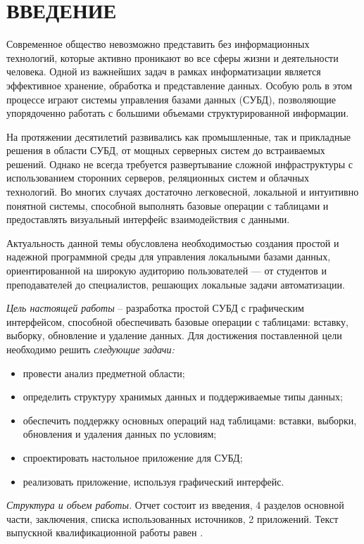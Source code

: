 \section*{ВВЕДЕНИЕ}

Современное общество невозможно представить без информационных технологий, которые активно проникают во все сферы жизни и деятельности человека. Одной из важнейших задач в рамках информатизации является эффективное хранение, обработка и представление данных. Особую роль в этом процессе играют системы управления базами данных (СУБД), позволяющие упорядоченно работать с большими объемами структурированной информации.

На протяжении десятилетий развивались как промышленные, так и прикладные решения в области СУБД, от мощных серверных систем до встраиваемых решений. Однако не всегда требуется развертывание сложной инфраструктуры с использованием сторонних серверов, реляционных систем и облачных технологий. Во многих случаях достаточно легковесной, локальной и интуитивно понятной системы, способной выполнять базовые операции с таблицами и предоставлять визуальный интерфейс взаимодействия с данными.

Актуальность данной темы обусловлена необходимостью создания простой и надежной программной среды для управления локальными базами данных, ориентированной на широкую аудиторию пользователей — от студентов и преподавателей до специалистов, решающих локальные задачи автоматизации.

\emph{Цель настоящей работы} – разработка простой СУБД с графическим интерфейсом, способной обеспечивать базовые операции с таблицами: вставку, выборку, обновление и удаление данных. Для достижения поставленной цели необходимо решить \emph{следующие задачи:}
\begin{itemize}
\item провести анализ предметной области;
\item определить структуру хранимых данных и поддерживаемые типы данных;
\item обеспечить поддержку основных операций над таблицами: вставки, выборки, обновления и удаления данных по условиям;
\item спроектировать настольное приложение для СУБД;
\item реализовать приложение, используя графический интерфейс.
\end{itemize}

\emph{Структура и объем работы.} Отчет состоит из введения, 4 разделов основной части, заключения, списка использованных источников, 2 приложений. Текст выпускной квалификационной работы равен .

